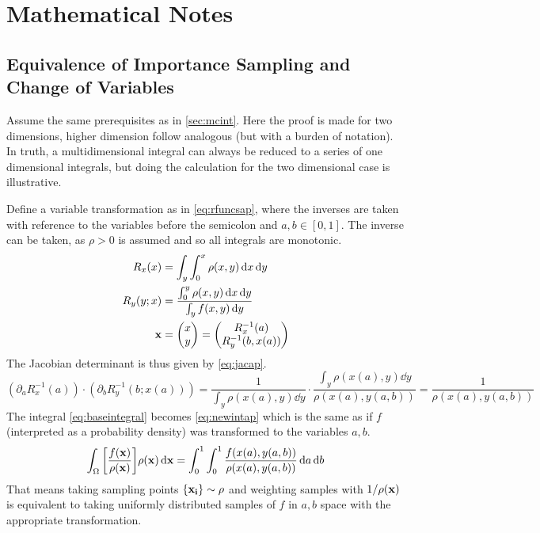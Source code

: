 \section{Mathematical Notes}%
\label{sec:matap}

\subsection{Equivalence of Importance Sampling and Change of
  Variables}%
\label{sec:equap}

Assume the same prerequisites as in \cref{sec:mcint}. Here the proof
is made for two dimensions, higher dimension follow analogous (but
with a burden of notation). In truth, a multidimensional integral can
always be reduced to a series of one dimensional integrals, but doing
the calculation for the two dimensional case is illustrative.

Define a variable transformation as in \cref{eq:rfuncsap}, where the
inverses are taken with reference to the variables before the
semicolon and \(a,b\in [0, 1]\). The inverse can be taken, as
\(\rho > 0\) is assumed and so all integrals are monotonic.
%
\begin{equation}
  \label{eq:rfuncsap}
  \begin{split}
  R_x(x) &= \int_y\int_0^x\rho(x, y) \dd{x}\dd{y} \\
  R_y(y; x) &= \frac{\int_0^y\rho(x, y) \dd{x}\dd{y}}{\int_y
              f(x,y)\dd{y}} \\
  \vb{x} &= \mqty(x \\ y) = \mqty(R_x^{-1}(a) \\ R_y^{-1}(b, x(a)))
  \end{split}
\end{equation}
%
The Jacobian determinant is thus given by \cref{eq:jacap}.
\begin{equation}
  \label{eq:jacap}
  (\partial_a R_x^{-1}(a))\cdot (\partial_b R_y^{-1}(b; x(a))) =
  \frac{1}{\int_y\rho(x(a), y)\dd{y}}\cdot \frac{\int_y\rho(x(a),
    y)\dd{y}}{\rho(x(a), y(a, b))} = \frac{1}{\rho(x(a), y(a, b))}
\end{equation}
%
The integral \cref{eq:baseintegral} becomes \cref{eq:newintap} which
is the same as if \(f\) (interpreted as a probability density) was
transformed to the variables \(a, b\).
%
\begin{equation}
  \label{eq:newintap}
  \int_\Omega
  \qty[\frac{f(\vb{x})}{\rho(\vb{x})}] \rho(\vb{x}) \dd{\vb{x}} =
  \int_0^1\int_0^1 \frac{f(x(a), y(a,b))}{\rho(x(a), y(a, b))} \dd{a}\dd{b}
\end{equation}
%
That means taking sampling points \(\{\vb{x_i}\}\sim \rho\) and
weighting samples with \(1/\rho(\vb{x})\) is equivalent to taking
uniformly distributed samples of \(f\) in \(a,b\) space with the
appropriate transformation.

